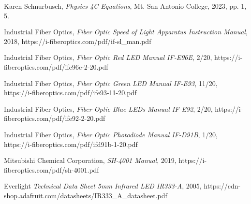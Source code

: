 \documentclass[12pt]{iopart} %
\begin{document}
\begin{thebibliography}{9}

  Karen Schnurbusch,
  \textit{Physics 4C Equations},
  Mt. San Antonio College,
  2023,
  pp. 1, 5.

  Industrial Fiber Optics,
  \textit{Fiber Optic Speed of Light Apparatus Instruction Manual},
  2018,
  https://i-fiberoptics.com/pdf/if-sl\_man.pdf

  Industrial Fiber Optics,
  \textit{Fiber Optic Red LED Manual IF-E96E},
  2/20,
  https://i-fiberoptics.com/pdf/ife96e-2-20.pdf

  Industrial Fiber Optics,
  \textit{Fiber Optic Green LED Manual IF-E93},
  11/20,
  https://i-fiberoptics.com/pdf/ife93-11-20.pdf

  Industrial Fiber Optics,
  \textit{Fiber Optic Blue LEDs Manual IF-E92},
  2/20,
  https://i-fiberoptics.com/pdf/ife92-2-20.pdf

  Industrial Fiber Optics,
  \textit{Fiber Optic Photodiode Manual IF-D91B},
  1/20,
  https://i-fiberoptics.com/pdf/ifd91b-1-20.pdf

  Mitsubishi Chemical Corporation,
  \textit{SH-4001 Manual},
  2019,
  https://i-fiberoptics.com/pdf/sh-4001.pdf

  Everlight
  \textit{Technical Data Sheet 5mm Infrared LED IR333-A},
  2005,
  https://cdn-shop.adafruit.com/datasheets/IR333\_A\_datasheet.pdf

\end{thebibliography}
\end{document}
